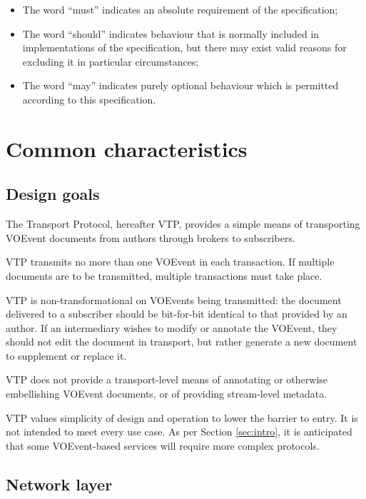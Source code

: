 \documentclass[a4paper,11pt]{ivoa}
\begin{document}
\begin{itemize}
    \item{The word ``must'' indicates an absolute requirement of the
    specification;}

    \item{The word ``should'' indicates behaviour that is normally included in
    implementations of the specification, but there may exist valid reasons
    for excluding it in particular circumstances;}

    \item{The word ``may'' indicates purely optional behaviour which is
    permitted according to this specification.}
\end{itemize}

\section{Common characteristics}

\subsection{Design goals}
\label{sec:common:design}

The Transport Protocol, hereafter VTP, provides a simple means of transporting
VOEvent documents from authors through brokers to subscribers.

VTP transmits no more than one VOEvent in each transaction. If multiple
documents are to be transmitted, multiple transactions must take place.

VTP is non-transformational on VOEvents being transmitted: the document
delivered to a subscriber should be bit-for-bit identical to that provided by
an author. If an intermediary wishes to modify or annotate the VOEvent, they
should not edit the document in transport, but rather generate a new document
to supplement or replace it.

VTP does not provide a transport-level means of annotating or otherwise
embellishing VOEvent documents, or of providing stream-level metadata.

VTP values simplicity of design and operation to lower the barrier to entry. It
is not intended to meet every use case. As per Section \ref{sec:intro}, it is
anticipated that some VOEvent-based services will require more complex
protocols.

\subsection{Network layer}
\end{document}
